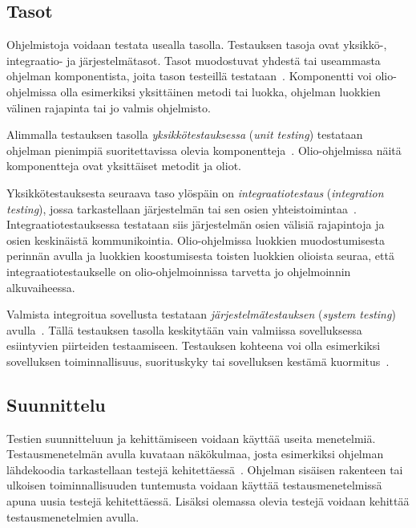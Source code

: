 \documentclass[finnish, grading]{tktltiki2}
\theoremstyle{definition}
\theoremstyle{remark}
\begin{document}
\subsection{Tasot}

Ohjelmistoja voidaan testata usealla tasolla. Testauksen tasoja ovat yksikkö-, integraatio- ja järjestelmätasot. Tasot muodostuvat yhdestä tai useammasta ohjelman komponentista, joita tason testeillä testataan~\cite[s. 45]{Binder:1999}. Komponentti voi olio-ohjelmissa olla esimerkiksi yksittäinen metodi tai luokka, ohjelman luokkien välinen rajapinta tai jo valmis ohjelmisto.

Alimmalla testauksen tasolla \textit{yksikkötestauksessa} (\textit{unit testing}) testataan ohjelman pienimpiä suoritettavissa olevia komponentteja~\cite[s. 45]{Binder:1999}. Olio-ohjelmissa näitä komponentteja ovat yksittäiset metodit ja oliot.

Yksikkötestauksesta seuraava taso ylöspäin on \textit{integraatiotestaus} (\textit{integration testing}), jossa tarkastellaan järjestelmän tai sen osien yhteistoimintaa~\cite[s. 45]{Binder:1999}. Integraatiotestauksessa testataan siis järjestelmän osien välisiä rajapintoja ja osien keskinäistä kommunikointia. Olio-ohjelmissa luokkien muodostumisesta perinnän avulla ja luokkien koostumisesta toisten luokkien olioista seuraa, että integraatiotestaukselle on olio-ohjelmoinnissa tarvetta jo ohjelmoinnin alkuvaiheessa.

Valmista integroitua sovellusta testataan \textit{järjestelmätestauksen} (\textit{system testing}) avulla~\cite[s. 45]{Binder:1999}. Tällä testauksen tasolla keskitytään vain valmiissa sovelluksessa esiintyvien piirteiden testaamiseen. Testauksen kohteena voi olla esimerkiksi sovelluksen toiminnallisuus, suorituskyky tai sovelluksen kestämä kuormitus~\cite[s. 45]{Binder:1999}.

\subsection{Suunnittelu}

Testien suunnitteluun ja kehittämiseen voidaan käyttää useita menetelmiä. Testausmenetelmän avulla kuvataan näkökulmaa, josta esimerkiksi ohjelman lähdekoodia tarkastellaan testejä kehitettäessä~\cite[s. 51]{Binder:1999}. Ohjelman sisäisen rakenteen tai ulkoisen toiminnallisuuden tuntemusta voidaan käyttää testausmenetelmissä apuna uusia testejä kehitettäessä. Lisäksi olemassa olevia testejä voidaan kehittää testausmenetelmien avulla.
\end{document}
